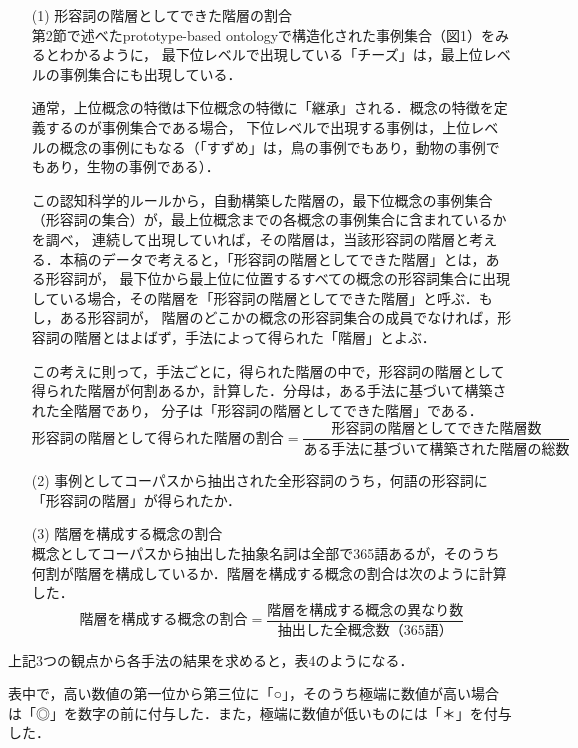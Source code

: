 \documentclass[japanese]{jnlp_1.4}
\begin{document}
\begin{itemize}
\item[(1)]形容詞の階層としてできた階層の割合\\
第2節で述べたprototype-based ontologyで構造化された事例集合（図1）をみるとわかるように，
最下位レベルで出現している「チーズ」は，最上位レベルの事例集合にも出現している．

通常，上位概念の特徴は下位概念の特徴に「継承」される．概念の特徴を定義するのが事例集合である場合，
下位レベルで出現する事例は，上位レベルの概念の事例にもなる（「すずめ」は，鳥の事例でもあり，動物の事例でもあり，生物の事例である）．

この認知科学的ルールから，自動構築した階層の，最下位概念の事例集合（形容詞の集合）が，最上位概念までの各概念の事例集合に含まれているかを調べ，
連続して出現していれば，その階層は，当該形容詞の階層と考える．本稿のデータで考えると，「形容詞の階層としてできた階層」とは，ある形容詞が，
最下位から最上位に位置するすべての概念の形容詞集合に出現している場合，その階層を「形容詞の階層としてできた階層」と呼ぶ．もし，ある形容詞が，
階層のどこかの概念の形容詞集合の成員でなければ，形容詞の階層とはよばず，手法によって得られた「階層」とよぶ．

この考えに則って，手法ごとに，得られた階層の中で，形容詞の階層として得られた階層が何割あるか，計算した．分母は，ある手法に基づいて構築された全階層であり，
分子は「形容詞の階層としてできた階層」である．\\
\begin{equation}
形容詞の階層として得られた階層の割合 = \frac{形容詞の階層としてできた階層数}{ある手法に基づいて構築された階層の総数} 
\end{equation}
\item[(2)]
 事例としてコーパスから抽出された全形容詞のうち，何語の形容詞に「形容詞の階層」が得られたか．
\item[(3)]
階層を構成する概念の割合 \\
概念としてコーパスから抽出した抽象名詞は全部で365語あるが，そのうち何割が階層を構成しているか．階層を構成する概念の割合は次のように計算した．
\begin{equation}
階層を構成する概念の割合 = \frac{階層を構成する概念の異なり数}{抽出した全概念数（365語）}
\end{equation}
\end{itemize}

上記3つの観点から各手法の結果を求めると，表4のようになる．

表中で，高い数値の第一位から第三位に「○」，そのうち極端に数値が高い場合は「◎」を数字の前に付与した．また，極端に数値が低いものには「＊」を付与した．
\end{document}
